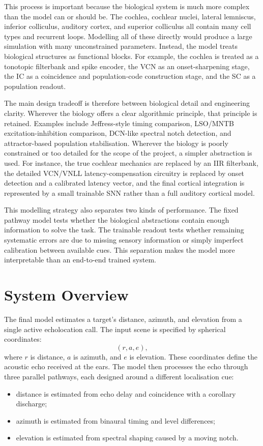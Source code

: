 This process is important because the biological system is much more complex than the model can or should be. The cochlea, cochlear nuclei, lateral lemniscus, inferior colliculus, auditory cortex, and superior colliculus all contain many cell types and recurrent loops. Modelling all of these directly would produce a large simulation with many unconstrained parameters. Instead, the model treats biological structures as functional blocks. For example, the cochlea is treated as a tonotopic filterbank and spike encoder, the VCN as an onset-sharpening stage, the IC as a coincidence and population-code construction stage, and the SC as a population readout.

The main design tradeoff is therefore between biological detail and engineering clarity. Wherever the biology offers a clear algorithmic principle, that principle is retained. Examples include Jeffress-style timing comparison, LSO/MNTB excitation-inhibition comparison, DCN-like spectral notch detection, and attractor-based population stabilisation. Wherever the biology is poorly constrained or too detailed for the scope of the project, a simpler abstraction is used. For instance, the true cochlear mechanics are replaced by an IIR filterbank, the detailed VCN/VNLL latency-compensation circuitry is replaced by onset detection and a calibrated latency vector, and the final cortical integration is represented by a small trainable SNN rather than a full auditory cortical model.

This modelling strategy also separates two kinds of performance. The fixed pathway model tests whether the biological abstractions contain enough information to solve the task. The trainable readout tests whether remaining systematic errors are due to missing sensory information or simply imperfect calibration between available cues. This separation makes the model more interpretable than an end-to-end trained system.


\section{System Overview}

The final model estimates a target's distance, azimuth, and elevation from a single active echolocation call. The input scene is specified by spherical coordinates:
\begin{equation}
    (r, a, e),
\end{equation}
where $r$ is distance, $a$ is azimuth, and $e$ is elevation. These coordinates define the acoustic echo received at the ears. The model then processes the echo through three parallel pathways, each designed around a different localisation cue:
\begin{itemize}
    \item distance is estimated from echo delay and coincidence with a corollary discharge;
    \item azimuth is estimated from binaural timing and level differences;
    \item elevation is estimated from spectral shaping caused by a moving notch.
\end{itemize}

